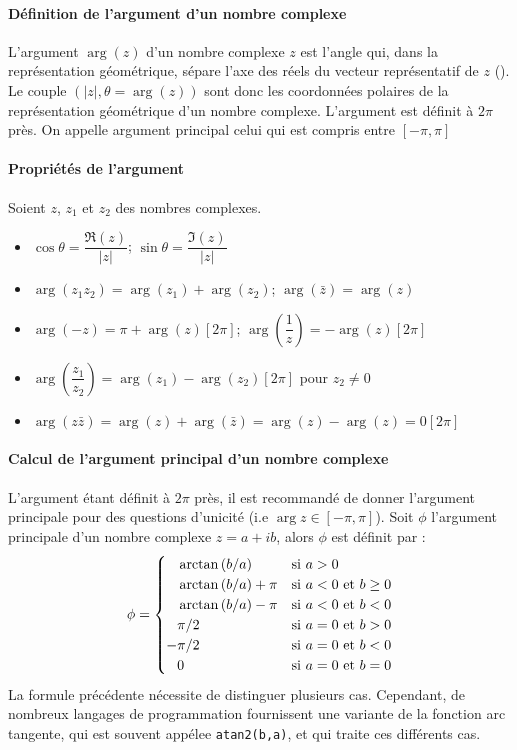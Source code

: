 \paragraph{Définition de l'argument d'un nombre complexe}
L'argument $\arg{(z)}$ d'un nombre complexe $z$ est l'angle qui, dans la représentation géométrique, sépare l'axe des réels du vecteur représentatif de $z$ ().
Le couple $(|z|,\theta=\arg{(z)})$ sont donc les coordonnées polaires de la représentation géométrique d'un nombre complexe.
L'argument est définit à $2\pi$ près. On appelle argument principal celui qui est compris entre $[-\pi,\pi]$

\newpage
\paragraph{Propriétés de l'argument}
Soient $z$, $z_1$ et $z_2$ des nombres complexes.
\begin{itemize}
    \item $\cos\theta=\dfrac{\Re(z)}{|z|}$; $\sin\theta=\dfrac{\Im(z)}{|z|}$
    \item $\arg(z_1z_2)=\arg(z_1)+\arg(z_2)$; $\arg(\bar{z})=\arg(z)$
    \item $\arg(-z)=\pi+\arg(z)[2\pi]$; $\arg\left(\dfrac{1}{z}\right)=-\arg(z)[2\pi]$
    \item $\arg\left(\dfrac{z_1}{z_2}\right)=\arg(z_1)-\arg(z_2)[2\pi]$ pour $z_2\neq0$
    \item $\arg(z\bar{z})=\arg(z)+\arg(\bar{z})=\arg(z)-\arg(z)=0[2\pi]$
\end{itemize}

\paragraph{Calcul de l'argument principal d'un nombre complexe}
L'argument étant définit à $2\pi$ près, il est recommandé de donner l'argument principale 
pour des questions d'unicité (i.e $\arg{z}\in[-\pi,\pi]$). 
Soit $\phi$ l'argument principale d'un nombre complexe $z=a+ib$, alors $\phi$ est définit par :
$$
\phi=
\begin{cases}
    \hphantom{-}\arctan{(b/a)}     & \text{si $a>0$} \\
    \hphantom{-}\arctan{(b/a)}+\pi & \text{si $a<0$ et $b\ge0$} \\
    \hphantom{-}\arctan{(b/a)}-\pi & \text{si $a<0$ et $b<0$} \\
    \hphantom{-} \pi/2             & \text{si $a=0$ et $b>0$} \\
                -\pi/2             & \text{si $a=0$ et $b<0$} \\
    \hphantom{-}0                  & \text{si $a=0$ et $b=0$} \\
\end{cases}
$$
La formule précédente nécessite de distinguer plusieurs cas.
Cependant, de nombreux langages de programmation fournissent
une variante de la fonction arc tangente, qui est souvent appélee
\verb?atan2(b,a)?, et qui traite ces différents cas. 


